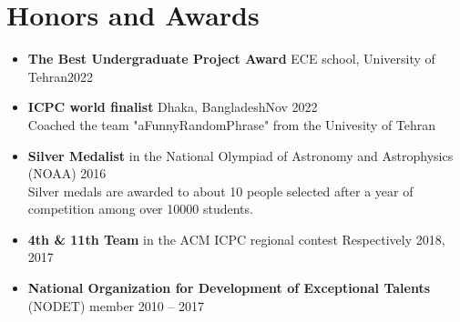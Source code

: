 \documentclass[a4paper,10pt]{article}
\makeatletter
\newcommand{\resumeSubheading}[4]{
  \item
    \begin{tabular*}{0.98\textwidth}[t]{l@{\extracolsep{\fill}}r}
      \textbf{#1} & #2 \\
      #3 & #4 \\
    \end{tabular*}
}
\newcommand{\resumeSubHeadingListStart}{\begin{itemize}[leftmargin=*]}
\newcommand{\resumeSubHeadingListEnd}{\end{itemize}}
\newcommand{\resumeItemListStart}{\begin{itemize}\vspace{-4pt}}
\newcommand{\resumeItemListEnd}{\end{itemize}}
\makeatother
\begin{document}
\section{Honors and Awards}
  
\resumeSubHeadingListStart

\item \textbf{The Best Undergraduate Project Award} ECE school, University of Tehran\hfill  2022
\\

\item \textbf{ICPC world finalist} Dhaka, Bangladesh\hfill  Nov 2022
\\
    \small
    Coached the team "aFunnyRandomPhrase" from the Univesity of Tehran
    \normalsize

\item \textbf{Silver Medalist} in the  National Olympiad of Astronomy and Astrophysics (NOAA) \hfill 2016
\\
 \small
  Silver medals are awarded to about 10 people selected after a year of competition among over 10000 students.
  \normalsize

\item \textbf{4th \& 11th Team} in the ACM ICPC regional contest \hfill Respectively 2018, 2017

  
  
  \item \textbf{National Organization for Development of Exceptional Talents} (NODET) member \hfill  2010 – 2017

  \resumeSubHeadingListEnd
      

\end{document}
